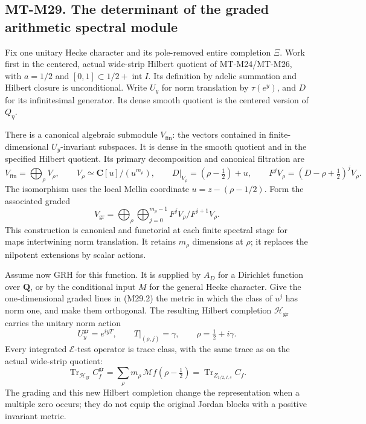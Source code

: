 \subsection*{MT-M29. The determinant of the graded arithmetic spectral module}
Fix one unitary Hecke character and its pole-removed entire
completion \(\Xi\). Work first in the centered, actual wide-strip
Hilbert quotient of MT-M24/MT-M26, with \(a=1/2\) and
\([0,1]\subset1/2+\operatorname{int}I\). Its definition by adelic
summation and Hilbert closure is unconditional. Write \(U_y\)
for norm translation by \(\tau(e^y)\), and \(D\) for its
infinitesimal generator. Its dense smooth quotient is the
centered version of \(Q_\eta\).

There is a canonical algebraic submodule \(V_{\mathrm{fin}}\):
the vectors contained in finite-dimensional \(U_y\)-invariant
subspaces. It is dense in the smooth quotient and in the
specified Hilbert quotient. Its primary decomposition and
canonical filtration are
\[
 V_{\mathrm{fin}}=\bigoplus_\rho V_\rho,\qquad
 V_\rho\simeq\mathbf C[u]/(u^{m_\rho}),\qquad
 D|_{V_\rho}=(\rho-\tfrac12)+u,\qquad
 F^jV_\rho=(D-\rho+\tfrac12)^jV_\rho .
                                                               \tag{M29.1}
\]
The isomorphism uses the local Mellin coordinate
\(u=z-(\rho-1/2)\). Form the associated graded
\[
       V_{\mathrm{gr}}
          =\bigoplus_\rho\bigoplus_{j=0}^{m_\rho-1}
                         F^jV_\rho/F^{j+1}V_\rho.             \tag{M29.2}
\]
This construction is canonical and functorial at each finite
spectral stage for maps intertwining norm translation. It
retains \(m_\rho\) dimensions at \(\rho\); it replaces the
nilpotent extensions by scalar actions.

Assume now GRH for this function. It is supplied by \(A_D\)
for a Dirichlet function over \(\mathbf Q\), or by the
conditional input \(M\) for the general Hecke character.
Give the one-dimensional graded lines in (M29.2) the metric
in which the class of \(u^j\) has norm one, and make them
orthogonal. The resulting Hilbert completion
\(\mathcal H_{\mathrm{gr}}\) carries the unitary norm action
\[
        U_y^{\mathrm{gr}}=e^{iyT},\qquad
        T|_{(\rho,j)}=\gamma,\qquad \rho=\tfrac12+i\gamma.
                                                               \tag{M29.3}
\]
Every integrated \(\mathcal E\)-test operator is trace class,
with the same trace as on the actual wide-strip quotient:
\[
 \operatorname{Tr}_{\mathcal H_{\mathrm{gr}}}C_f^{\mathrm{gr}}
       =\sum_\rho m_\rho\,\mathcal Mf(\rho-\tfrac12)
       =\operatorname{Tr}_{Z_{1/2,I,s}} C_f .                  \tag{M29.4}
\]
The grading and this new Hilbert completion change the
representation when a multiple zero occurs; they do not
equip the original Jordan blocks with a positive invariant
metric.

